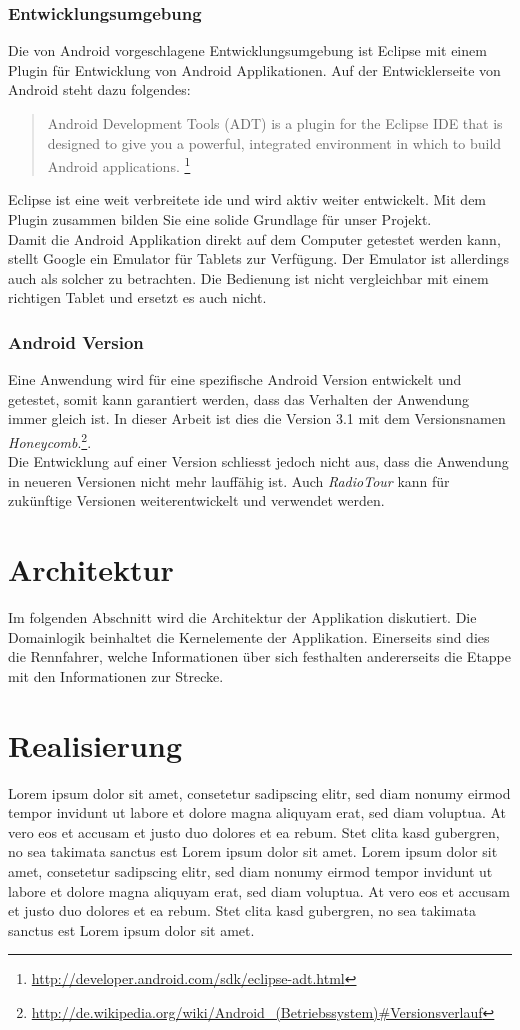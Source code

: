 \subsection{Entwicklungsumgebung}
Die von Android vorgeschlagene Entwicklungsumgebung ist Eclipse mit einem Plugin für Entwicklung von Android Applikationen. Auf der Entwicklerseite von Android steht dazu folgendes:
\begin{quote}
Android Development Tools (ADT) is a plugin for the Eclipse IDE that is designed to give you a powerful, integrated environment in which to build Android applications.
\footnote{\url{http://developer.android.com/sdk/eclipse-adt.html}}
\end{quote}
Eclipse ist eine weit verbreitete \gls{ide} und wird aktiv weiter entwickelt. Mit dem Plugin zusammen bilden Sie eine solide Grundlage für unser Projekt.
\\
Damit die Android Applikation direkt auf dem Computer getestet werden kann, stellt Google ein Emulator für Tablets zur Verfügung. Der Emulator ist allerdings auch als solcher zu betrachten. Die Bedienung ist nicht vergleichbar mit einem richtigen Tablet und ersetzt es auch nicht.

\subsection{Android Version}
Eine Anwendung wird für eine spezifische Android Version entwickelt und getestet, somit kann garantiert werden, dass das Verhalten der Anwendung  immer gleich ist. In dieser Arbeit ist dies die Version 3.1 mit dem Versionsnamen \textit{Honeycomb}.\footnote{\url{http://de.wikipedia.org/wiki/Android_(Betriebssystem)\#Versionsverlauf}}.
\\
Die Entwicklung auf einer Version schliesst jedoch nicht aus, dass die Anwendung in neueren Versionen nicht mehr lauffähig ist. Auch \textit{RadioTour} kann für zukünftige Versionen weiterentwickelt und verwendet werden.

\chapter{Architektur}
Im folgenden Abschnitt wird die Architektur der Applikation diskutiert. Die Domainlogik beinhaltet die Kernelemente der Applikation. Einerseits sind dies die Rennfahrer, welche Informationen über sich festhalten andererseits die Etappe mit den Informationen zur Strecke.


\chapter{Realisierung}
Lorem ipsum dolor sit amet, consetetur sadipscing elitr, sed diam nonumy eirmod tempor invidunt ut labore et dolore magna aliquyam erat, sed diam voluptua. At vero eos et accusam et justo duo dolores et ea rebum. Stet clita kasd gubergren, no sea takimata sanctus est Lorem ipsum dolor sit amet. Lorem ipsum dolor sit amet, consetetur sadipscing elitr, sed diam nonumy eirmod tempor invidunt ut labore et dolore magna aliquyam erat, sed diam voluptua. At vero eos et accusam et justo duo dolores et ea rebum. Stet clita kasd gubergren, no sea takimata sanctus est Lorem ipsum dolor sit amet.

